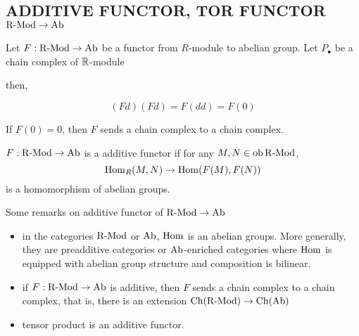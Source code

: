 \documentclass{report}
\begin{document}
\subsection{ADDITIVE FUNCTOR, TOR FUNCTOR $\operatorname{R-Mod} \to \operatorname{Ab}$}

\begin{remark}
    Let $F: \operatorname{R-Mod} \to \operatorname{Ab}$ be a functor from $R$-module to abelian group. Let $P_\bullet$ be a chain complex of $\mathbb{R}$-module
    
    \begin{center}
    \end{center}
    
    then,
    
    $$
        (Fd) (Fd) = F(dd) = F(0)
    $$
    
    If $F(0) = 0$, then $F$ sends a chain complex to a chain complex.
\end{remark}

\begin{definition}
    $F: \operatorname{R-Mod} \to \operatorname{Ab}$ is a additive functor if for any $M, N \in \operatorname{ob} \operatorname{R-Mod}$,
    $$
        \operatorname{Hom}_R(M, N) \to \operatorname{Hom}(F(M), F(N))
    $$
    is a homomorphism of abelian groups.
\end{definition}

\begin{remark}
    Some remarks on additive functor of $\operatorname{R-Mod} \to \operatorname{Ab}$
    \begin{itemize}
        \item in the categories $\operatorname{R-Mod}$ or $\operatorname{Ab}$, $\operatorname{Hom}$ is an abelian groups. More generally, they are preadditive categories or $\operatorname{Ab}$-enriched categories where $\operatorname{Hom}$ is equipped with abelian group structure and composition is bilinear. 

        \item if $F: \operatorname{R-Mod} \to \operatorname{Ab}$ is additive, then $F$ sends a chain complex to a chain complex, that is, there is an extension $\operatorname{Ch}(\operatorname{R-Mod}) \to \operatorname{Ch}(\operatorname{Ab})$

        \item tensor product is an additive functor.
    \end{itemize}
\end{remark}
\end{document}
